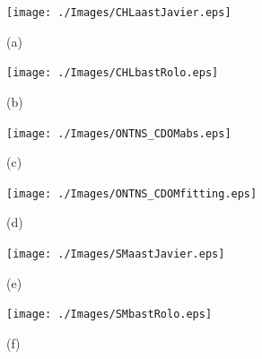\documentclass[onecolumn,3p,letterpaper]{elsarticle}
\begin{document}
\begin{figure}[htb!]
    \begin{minipage}[c]{0.48\linewidth}
      \centering
      \texttt{[image: ./Images/CHLaastJavier.eps]}
    \centerline{(a)}\medskip
    \end{minipage}  
    \hfill
    \begin{minipage}[c]{0.48\linewidth}
      \centering
      \texttt{[image: ./Images/CHLbastRolo.eps]}
      \centerline{(b)}\medskip
    \end{minipage}  


  \begin{minipage}[c]{0.48\linewidth}
      \centering
      \texttt{[image: ./Images/ONTNS\_CDOMabs.eps]}
    \centerline{(c)}\medskip
    \end{minipage}  
    \hfill
    \begin{minipage}[c]{0.48\linewidth}
      \centering
      \texttt{[image: ./Images/ONTNS\_CDOMfitting.eps]}
      \centerline{(d)}\medskip
    \end{minipage}  



  \begin{minipage}[c]{0.48\linewidth}
      \centering
      \texttt{[image: ./Images/SMaastJavier.eps]}
      \centerline{(e)}\medskip
    \end{minipage}  
    \hfill
    \begin{minipage}[c]{0.48\linewidth}
      \centering
      \texttt{[image: ./Images/SMbastRolo.eps]}
      \centerline{(f)}\medskip
    \end{minipage}


\end{figure}
\end{document}
